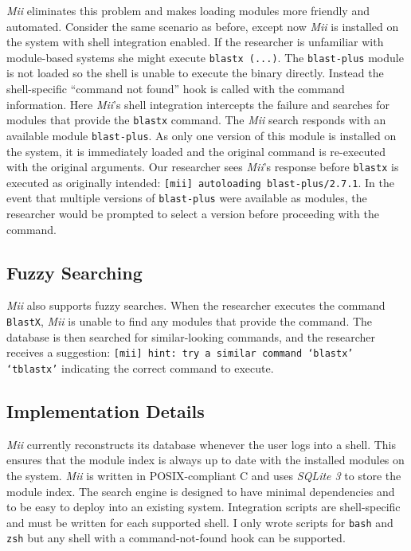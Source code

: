 \documentclass[manuscript,screen]{acmart}
\begin{document}
\par

\textit{Mii} eliminates this problem and makes loading modules more friendly and automated. Consider the same
scenario as before, except now \textit{Mii} is installed on the system with shell integration enabled. If the researcher
is unfamiliar with module-based systems she might execute \texttt{blastx (...)}. The \texttt{blast-plus} module is
not loaded so the shell is unable to execute the binary directly. Instead the shell-specific “command not
found” hook is called with the command information. Here \textit{Mii}’s shell integration intercepts the failure
and searches for modules that provide the \texttt{blastx} command. The \textit{Mii} search responds with an available
module \texttt{blast-plus}. As only one version of this module is installed on the system, it is immediately loaded
and the original command is re-executed with the original arguments. Our researcher sees \textit{Mii}’s response
before \texttt{blastx} is executed as originally intended: \texttt{[mii] autoloading blast-plus/2.7.1}. In the event that
multiple versions of \texttt{blast-plus} were available as modules, the researcher would be prompted to select a
version before proceeding with the command.

\subsection{Fuzzy Searching}

\textit{Mii} also supports fuzzy searches. When the researcher executes the command \texttt{BlastX}, \textit{Mii} is unable to find
any modules that provide the command. The database is then searched for similar-looking commands, and
the researcher receives a suggestion: \texttt{[mii] hint: try a similar command ‘blastx’ ‘tblastx’} indicating
the correct command to execute.

\subsection{Implementation Details}

\textit{Mii} currently reconstructs its database whenever the user logs into a shell. This ensures that the module index is
always up to date with the installed modules on the system. \textit{Mii} is written in POSIX-compliant C and uses
\textit{SQLite 3} to store the module index. The search engine is designed to have minimal dependencies and to be
easy to deploy into an existing system. Integration scripts are shell-specific and must be written for each
supported shell. I only wrote scripts for \texttt{bash} and \texttt{zsh} but any shell with a command-not-found hook can be
supported.
\end{document}
